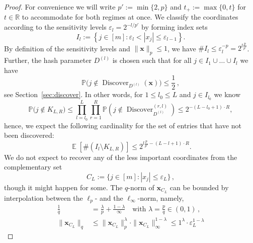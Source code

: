 \documentclass[12pt]{article}
\theoremstyle{plain}
\theoremstyle{definition}
\renewcommand{\P}{{\mathbb P}}
\newcommand{\expect}{\operatorname{\mathbb{E}}}
\newcommand{\eps}{\varepsilon}
\renewcommand{\vec}{\boldsymbol}
\newcommand{\R}{{\mathbb R}}
\DeclareMathOperator{\discover}{Discover} %
\begin{document}
\begin{proof}
    For convenience we will write $p' := \min\{2,p\}$ and $t_+ := \max\{0,t\}$ for $t \in \R$
    to accommodate for both regimes at once.
    We classify the coordinates according to the sensitivity levels $\eps_l = 2^{-l/p'}$
    by forming index sets
    \begin{equation*}
        I_l := \left\{ j \in [m] \colon \eps_l < |x_j| \leq \eps_{l-1}\right\} .
    \end{equation*}
    By definition of the sensitivity levels and $\|\vec{x}\|_p \leq 1$,
    we have \mbox{$\#I_l \leq \eps_l^{-p} = 2^{l\frac{p}{p'}}$}.
    Further, the hash parameter $D^{(l)}$ is chosen such that
    for all \mbox{$j \in I_1\cup\ldots \cup I_l$} we have
    \begin{equation*}
        \P\bigl( j \notin \discover_{D^{(l)}}(\vec{x}) \bigr) \leq \frac{1}{2} \,,
    \end{equation*}
    see Section~\ref{sec:discover}.
    In other words, for $1 \leq l_0 \leq L$ and $j \in I_{l_0}$ we know
    \begin{equation*}
        \P\bigl( j \notin K_{L,R} \bigr)
            \leq \prod_{l=l_0}^L \prod_{r=1}^R \P\left( j \notin \discover_{D^{(l)}}^{(r,l)}\right)
            \leq 2^{-(L - l_0 + 1) \cdot R} ,
    \end{equation*}
    hence, we expect the following cardinality for the set of entries that have not been discovered:
    \begin{equation*}
        \expect \left[\# (I_l \setminus K_{L,R})\right]
            \leq 2^{ l\frac{p}{p'} - (L - l + 1) \cdot R} .
    \end{equation*}
    We do not expect to recover any of the less important coordinates from the complementary set
    \begin{equation*}
        C_L := \{j \in [m] \colon |x_j| \leq \eps_L \}\,,
    \end{equation*}
    though it might happen for some. 
    The $q$-norm of $\vec{x}_{C_L}$ can be bounded by interpolation between the $\ell_p$- and the $\ell_\infty$-norm,
    namely,
    \begin{align}
        \frac{1}{q} &= \frac{\lambda}{p} + \frac{1-\lambda}{\infty}
        \quad\text{with } \lambda = \frac{p}{q} \in (0,1)\,, 
        \nonumber
        \\
        \|\vec{x}_{C_L}\|_q
            &\leq \|\vec{x}_{C_L}\|_p^\lambda \cdot \|\vec{x}_{C_L}\|_\infty^{1-\lambda}
            \leq 1^\lambda \cdot \eps_L^{1-\lambda}

\end{align}
\end{proof}
\end{document}
